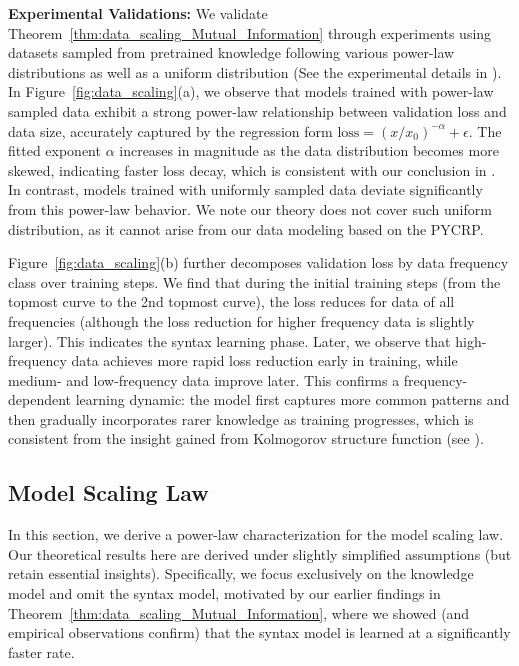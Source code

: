 \documentclass[11pt]{article}
\theoremstyle{plain}
\theoremstyle{definition}
\begin{document}
\noindent
{\bf Experimental Validations:}  
We validate Theorem~\ref{thm:data_scaling_Mutual_Information} through experiments using datasets sampled from pretrained knowledge following various power-law distributions as well as a uniform distribution
(See the experimental details in ).  
In Figure~\ref{fig:data_scaling}(a), we observe that models trained with power-law sampled data exhibit a strong power-law relationship between validation loss and data size, accurately captured by the regression form \( \mathrm{loss} = (x/x_0)^{-\alpha} + \epsilon \). The fitted exponent $\alpha$ increases in magnitude as the data distribution becomes more skewed, indicating faster loss decay, which is consistent with our conclusion in . In contrast, models trained with uniformly sampled data deviate significantly from this power-law behavior.  We note our theory does not cover such uniform distribution, as
it cannot arise from our data modeling based on the PYCRP.


Figure~\ref{fig:data_scaling}(b) further decomposes validation loss by data frequency class over training steps. 
We find that during the initial training steps (from the topmost curve 
to the 2nd topmost curve), the loss reduces for data of all frequencies 
(although the loss reduction for higher frequency data is slightly larger).
This indicates the syntax learning phase.
Later, we observe that high-frequency data achieves more rapid loss reduction early in training, while medium- and low-frequency data improve later. This confirms a frequency-dependent learning dynamic: the model first captures more common patterns and then gradually incorporates rarer knowledge as training progresses, which is consistent
from the insight gained from Kolmogorov structure function
(see ).

\vspace{-0.15cm}



\subsection{Model Scaling Law}
\label{sec:model_scaling_law}



In this section, we derive a power-law characterization for the model scaling law. Our theoretical results here are derived under slightly simplified assumptions 
(but retain essential insights).
Specifically, we focus exclusively on the knowledge model and omit the syntax model, motivated by our earlier findings in Theorem~\ref{thm:data_scaling_Mutual_Information}, where we showed (and empirical observations confirm) that the syntax model is learned at a significantly faster rate. 
\end{document}
